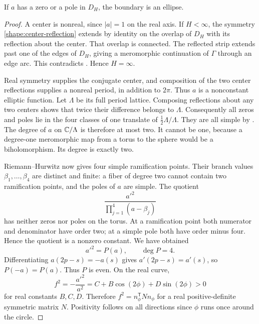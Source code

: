 \begin{theorem}
\label{thm:isotropic-classification}
If \(a\) has a zero or a pole in \(D_H\), the boundary is an ellipse.
\end{theorem}

\begin{proof}
A center is nonreal, since \(|a|=1\) on the real axis. If \(H<\infty\),
the symmetry \eqref{shape:center-reflection} extends by identity on
the overlap of \(D_H\) with its reflection about the center. That
overlap is connected. The reflected strip extends past one of the
edges of \(D_H\), giving a meromorphic continuation of \(\Gamma\)
through an edge arc. This contradicts
. Hence \(H=\infty\).

Real symmetry supplies the conjugate center, and composition of the
two center reflections supplies a nonreal period, in addition to
\(2\pi\). Thus \(a\) is a nonconstant elliptic function. Let
\(\Lambda\) be its full period lattice. Composing reflections about
any two centers shows that twice their difference belongs to
\(\Lambda\). Consequently all zeros and poles lie in the four
classes of one translate of \(\frac12\Lambda/\Lambda\). They are
all simple by . The degree of \(a\) on
\(\mathbb C/\Lambda\) is therefore at most two. It cannot be one, because
a degree-one meromorphic map from a torus to the sphere would be a
biholomorphism. Its degree is exactly two.

Riemann--Hurwitz now gives four simple ramification points. Their
branch values \(\beta_1,\ldots,\beta_4\) are distinct and finite:
a fiber of degree two cannot contain two ramification points, and
the poles of \(a\) are simple. The quotient
\[
 \frac{a'^2}{\prod_{j=1}^4(a-\beta_j)}
\]
has neither zeros nor poles on the torus. At a ramification point
both numerator and denominator have order two; at a simple pole
both have order minus four. Hence the quotient is a nonzero
constant. We have obtained
\begin{equation}
 a'^2=P(a),\qquad \deg P=4.
 \label{shape:elliptic-normal-equation}
\end{equation}
Differentiating \(a(2p-s)=-a(s)\) gives
\(a'(2p-s)=a'(s)\), so \(P(-a)=P(a)\). Thus \(P\) is even.
On the real curve,
\[
 f^2=-\frac{a'^2}{a^2}
   =C+B\cos(2\phi)+D\sin(2\phi)>0
\]
for real constants \(B,C,D\). Therefore
\(f^2=n_\phi^{\mathsf T}Nn_\phi\) for a real positive-definite
symmetric matrix \(N\). Positivity follows on all directions since
\(\phi\) runs once around the circle.


\end{proof}
